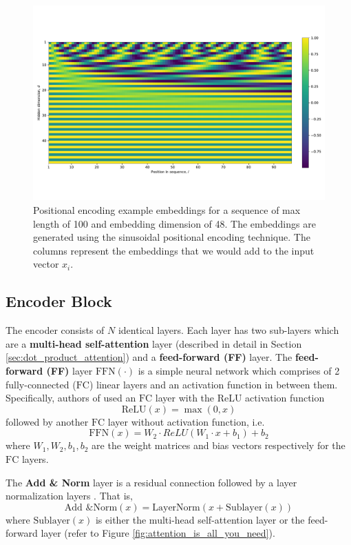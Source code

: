 \documentclass[a4paper, twoside]{report}
\theoremstyle{definition}
\numberwithin{equation}{section}
\begin{document}
\begin{figure}[h]
    \centering
    \includegraphics[width=\textwidth]{etc/pos_encoding.pdf}
    \caption{Positional encoding example embeddings for a sequence of max length of 100 and embedding dimension of 48.
        The embeddings are generated using the sinusoidal positional encoding technique.
        The columns represent the embeddings that we would add to the input vector $x_i$.
    }
    \label{fig:pos_encoding}
\end{figure}

\subsection{Encoder Block} \label{sec:encoder_block}

The encoder consists of $N$ identical layers. Each layer has two sub-layers which are a
\textbf{multi-head self-attention} layer (described in detail in Section \ref{sec:dot_product_attention})
and a \textbf{feed-forward (FF)} layer.
The \textbf{feed-forward (FF)} layer $\text{FFN}(\cdot)$ is a simple neural network
which comprises of 2 fully-connected ($\text{FC}$) linear layers and an activation function in between them.
Specifically, authors of \cite{1706.03762} used an $\text{FC}$ layer with
the ReLU activation function $$\text{ReLU}(x)=\max(0, x)$$
followed by another $\text{FC}$ layer without activation function, i.e.
$$\text{FFN}(x)=W_2 \cdot ReLU(W_1\cdot x+b_1)+b_2$$
where $W_1, W_2, b_1, b_2$ are the weight matrices and bias vectors respectively for the $\text{FC}$ layers.

The \textbf{Add \& Norm} layer is a residual connection \cite{1512.03385} followed by a layer normalization layers \cite{1607.06450}.
That is,
$$\text{Add \& Norm}(x)=\text{LayerNorm}(x+\text{Sublayer}(x))$$
where $\text{Sublayer}(x)$ is either the multi-head self-attention layer or the feed-forward layer (refer to Figure \ref{fig:attention_is_all_you_need}).
\end{document}
